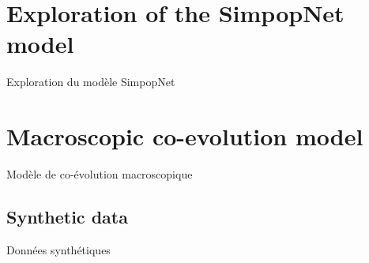 






\newpage

\section{Exploration of the SimpopNet model}{Exploration du modèle SimpopNet}

\label{app:sec:macrocoevolexplo}

















\newpage

\section{Macroscopic co-evolution model}{Modèle de co-évolution macroscopique}

\label{app:sec:macrocoevol}



\subsection{Synthetic data}{Données synthétiques}



